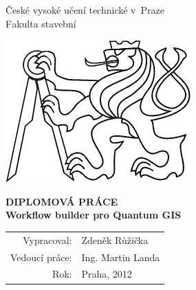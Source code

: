 \def \CVUT {České vysoké učení technické v~Praze}
\def \FSV {Fakulta stavební}
\def \KATEDRA {Katedra mapování a kartografie}
\def \BookName {DIPLOMOVÁ PRÁCE}
\def \Bookname {Workflow builder pro Quantum GIS}
\def \Authors {Zdeněk Růžička}
\def \DatumDP {Praha, 2012}
\newcommand{\vedouci}{Ing. Martin Landa}

\def \BookHeadDP {
    \begin{center}
    {\LARGE \textsc \CVUT}\\[2ex]
    {\LARGE \textsc \FSV}\\

    \vspace{2cm}
	\begin{center}
		\includegraphics[scale=0.55]{pictures/lev}
	\end{center}
    \vspace{1cm}

    {\textbf {\Huge \BookName \\[4ex]}
    {\LARGE \bf \Bookname}
    }

   \vfill
   {\large
    \begin{tabular}{rl}
    Vypracoval: & \Authors\\
    Vedoucí práce: & \vedouci\\
    Rok: & \DatumDP
    \end{tabular}
   }

    \newpage
    \end{center}
}
\pagestyle{empty}                       %
\BookHeadDP
\cleardoublepage

